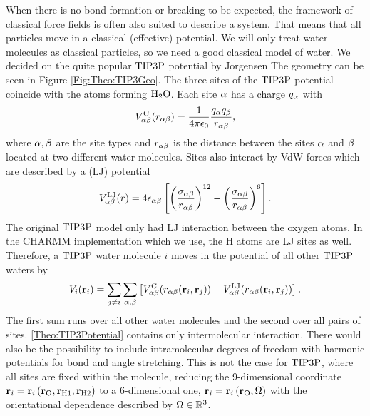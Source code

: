 When there is no bond formation or breaking to be expected, the framework of
classical force fields is often also suited to describe a system.
That means that
all particles move in a classical (effective) potential.
We will only treat water molecules as classical particles, so we need a good
classical model of water. We decided on the quite popular $\text{TIP3P}$ potential 
by Jorgensen \etal \cite{Jorgensen1983TIP3P} The geometry can be
seen in Figure \ref{Fig:Theo:TIP3Geo}. The three sites of the $\text{TIP3P}$ potential
coincide with the atoms forming $\text H _2 \text O$. Each site $\alpha$ has a charge $q_{\alpha}$ with 
\begin{equation}
V^{\text C}_{\alpha\beta}(r_{\alpha\beta})=\frac{1}{4\pi\epsilon_0}\frac{q_{\alpha}q_{\beta}}{r_{\alpha\beta}},
\label{Theo:TIP3EC}
\end{equation}
where $\alpha,\beta$ are the site types and $r_{\alpha\beta}$ is the distance between
the sites $\alpha$ and $\beta$ located at two different water molecules. Sites also
interact by VdW forces which are described by a 
(LJ) potential \newcommand\ELJ{\enmat V^{\te{LJ}}_{\al\be}}
\newcommand\salbe{\enmat{\si_{\al\be}}}
\newcommand\ealbe{\enmat{\eps_{\al\be}}}
\begin{equation}
\ELJ(r)=4\ealbe\ed{\rb{\frac{\salbe}{\ralbe}}^{12}-\rb{\frac{\salbe}{\ralbe}}^{6}}.
\label{Theo:TIP3ELJ}
\end{equation}
The original $\text{TIP3P}$ model only had LJ interaction between the oxygen atoms. In
the CHARMM implementation which we use, the H atoms are LJ
sites as well.\cite{CHARMM2009}
Therefore, a $\text{TIP3P}$ water molecule $i$ moves in the potential of all other $\text{TIP3P}$ waters by
\begin{equation}
V_i(\r_i)=\sum_{j\neq i} \sum_{\al,\be} \ed{\EC(\ralbe(\r_i,\r_j)) + \ELJ(\ralbe(\r_i,\r_j))}.
\label{Theo:TIP3Potential}
\end{equation}
The first sum runs over all other water molecules and the second over all
pairs of sites. \eqref{Theo:TIP3Potential} contains only
intermolecular interaction. There would also be the possibility to include intramolecular degrees of freedom with
harmonic potentials for bond and angle stretching. This is not the case for $\text{TIP3P}$,
where all sites are fixed within the molecule, reducing the 9-dimensional coordinate
\mbox{$\mathbf{r}_i=\mathbf{r}_i\left({\mathbf{r}_{\text O},\mathbf{r}_{\text H1},\mathbf{r}_{\text H2}}\right)$} to a 6-dimensional one, \mbox{$\mathbf{r}_i=\mathbf{r}_i\left({\mathbf{r}_{\text O},\Omega}\right)$}
with the orientational dependence described by $\Omega\in\mathbb{R}^3$.

